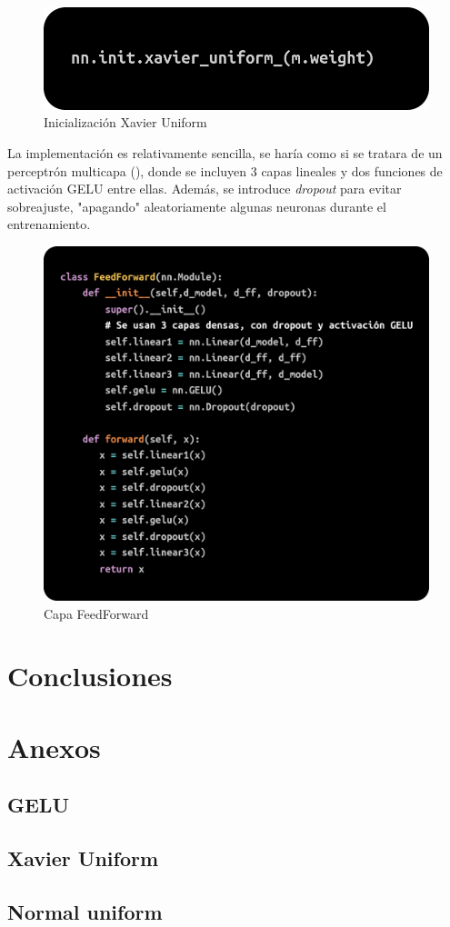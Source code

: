 \documentclass[11pt]{book}
\newcommand{\clearemptydoublepage}{\newpage{\pagestyle{empty}\cleardoublepage}}
\theoremstyle{plain}
\theoremstyle{definition}
\begin{document}
\begin{figure}[h]
    \centering
    \includegraphics[width=0.5\linewidth]{img/xavier_init.png}
    \caption{Inicialización Xavier Uniform}
    \label{fig:placeholder15}
\end{figure}

La implementación es relativamente sencilla, se haría como si se tratara de un perceptrón multicapa (\parencite{kyeg_feedforward_demystified}), donde se incluyen 3 capas lineales y dos funciones de activación GELU entre ellas. Además, se introduce \textit{dropout} para evitar sobreajuste, "apagando" aleatoriamente algunas neuronas durante el entrenamiento.


\begin{figure}[h]
    \centering
    \includegraphics[width=0.5\linewidth]{img/ffnn.png}
    \caption{Capa FeedForward}
    \label{fig:placeholder16}
\end{figure}


\clearemptydoublepage

\chapter{Conclusiones}


\clearemptydoublepage

\printbibliography[title={Referencias Bibliográficas}]

\appendix 
\chapter{Anexos}

\section{GELU} \label{sec:gelu}
\section{Xavier Uniform} \label{sec:xavier}
\section{Normal uniform} \label{sec:normal}


\clearemptydoublepage
\end{document}
